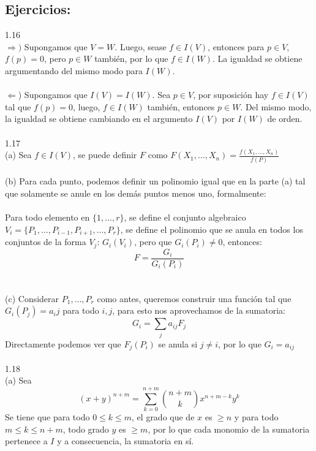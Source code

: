 \documentclass{article}
\begin{document}
\subsection*{Ejercicios:}
1.16
\\
$\Longrightarrow)$ Supongamos que $V=W$. Luego, sease $f \in I(V)$, entonces para $p \in V$, $f(p)=0$, pero $p \in W$ también, por lo que $f \in I(W)$. La igualdad se obtiene argumentando del mismo modo para $I(W)$.
\\
\\
$\Longleftarrow$) Supongamos que $I(V)=I(W)$. Sea $p \in V$, por suposición hay $f \in I(V)$ tal que $f(p)=0$, luego, $f \in I(W)$ también, entonces $p \in W$. Del mismo modo, la igualdad se obtiene cambiando en el argumento $I(V)$ por $I(W)$ de orden.
\\
\\
1.17
\\
(a) Sea $f \in I(V)$, se puede definir $F$ como $F(X_1, \dots,X_n)=\frac{f(X_1, \dots , X_n)}{f(P)}$
\\
\\
(b) Para cada punto, podemos definir un polinomio igual que en la parte (a) tal que solamente se anule en los demás puntos menos uno, formalmente:
\\
\\
Para todo elemento en $\{1,\dots,r \}$, se define el conjunto algebraico $V_i=\{P_1,\dots,P_{i-1},P_{i+1},\dots, P_r \}$, se define el polinomio que se anula en todos los conjuntos de la forma $V_j$: $G_{i}(V_i)$, pero que $G_{i}(P_i) \neq 0$, entonces:
\begin{equation*}
    F = \frac{G_i}{G_i(P_i)}
\end{equation*}
\\
\\
(c) Considerar $P_1,\dots, P_r$ como antes, queremos construir una función tal que $G_i(P_j)=a_ij$ para todo $i,j$, para esto nos aprovechamos de la sumatoria:
\begin{equation*}
    G_i = \sum_{j} a_{ij} F_j
\end{equation*}
Directamente podemos ver que $F_j(P_i)$ se anula si $j \neq i$, por lo que $G_i=a_{ij}$
\\
\\
1.18
\\
(a) Sea
\begin{equation*}
    (x+y)^{n+m} = \sum_{k=0}^{n+m} \binom{n+m}{k} x^{n+m-k} y^k
\end{equation*}
Se tiene que para todo $0 \leq k \leq m$, el grado que de $x$ es $\geq n$ y para todo $m \leq k \leq n+m$, todo grado $y$ es $\geq m$, por lo que cada monomio de la sumatoria pertenece a $I$ y a consecuencia, la sumatoria en sí.
\end{document}
